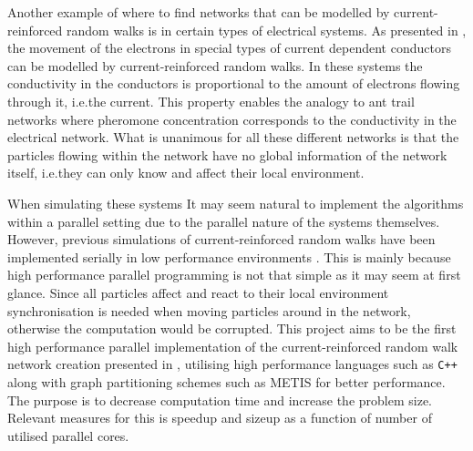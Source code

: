 Another example of where to find networks that can be modelled by current-reinforced random walks is in certain types of electrical systems. As presented in \cite{Sumpter}, the movement of the electrons in special types of current dependent conductors can be modelled by current-reinforced random walks. In these systems the conductivity in the conductors is proportional to the amount of electrons flowing through it, i.e.\@ the current. This property enables the analogy to ant trail networks where pheromone concentration corresponds to the conductivity in the electrical network. What is unanimous for all these different networks is that the particles flowing within the network have no global information of the network itself, i.e.\@ they can only know and affect their local environment. 

When simulating these systems It may seem natural to implement the algorithms within a parallel setting due to the parallel nature of the systems themselves. However, previous simulations of current-reinforced random walks have been implemented serially in low performance environments \cite{Sumpter, Ma2012rib}. This is mainly because high performance parallel programming is not that simple as it may seem at first glance. Since all particles affect and react to their local environment synchronisation is needed when moving particles around in the network, otherwise the computation would be corrupted. This project aims to be the first high performance parallel implementation of the current-reinforced random walk network creation presented in \cite{Sumpter}, utilising high performance languages such as \texttt{C++} along with graph partitioning schemes such as METIS \cite{Lasalle} for better performance. The purpose is to decrease computation time and increase the problem size. Relevant measures for this is speedup and sizeup as a function of number of utilised parallel cores.